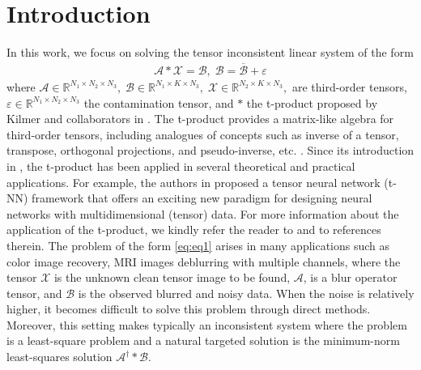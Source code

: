 \documentclass[11pt]{article}
\def\fm#1{\mathcal{#1}}
\def\r{\mathbb{R}}
\begin{document}
\section{Introduction}
In this work, we focus on solving the tensor inconsistent  linear system  of the form
\begin{align}
\label{eq:eq1}
\mathcal{A} * \mathcal{X} =  \mathcal{B},\;  \fm B = \overline{\fm B} + \varepsilon
\end{align}
where $\mathcal{A}\in\mathbb{R}^{N_1\times N_2\times N_3},\;
\mathcal{B}\in\mathbb{R}^{N_1\times K\times N_3},\;
\mathcal{X}\in\mathbb{R}^{N_2\times K\times N_3},$  are third-order tensors, $\varepsilon \in \r^{N_1\times N_2\times N_3}$ the contamination tensor,  and $*$ the t-product proposed by Kilmer and collaborators in  \cite{kilmer2011facto, kilmer2013thirdOrder}. The t-product provides a matrix-like algebra for third-order tensors, including analogues of  concepts such as inverse of a tensor, transpose, orthogonal projections, and  pseudo-inverse, etc. \cite{kilmer2011facto, kilmer2013thirdOrder}. Since its introduction in \cite{kilmer2011facto}, the t-product has been applied in several theoretical and practical applications. For example, the authors in \cite{newman2018} proposed a tensor neural network (t-NN) framework that offers an exciting new paradigm for designing neural networks with multidimensional (tensor) data. For more information about the application of the t-product, we  kindly refer the reader to  \cite{zhang2018, qi2021, wang2020, newman2018, miao2020gener} and to  references therein. The problem of the form \eqref{eq:eq1} arises in many applications such as color image recovery,  MRI images deblurring with multiple channels, where the tensor  $\fm X$ is the unknown clean tensor image to be found, $\fm A$, is a blur operator tensor, and $\fm B$ is the observed blurred and noisy data. When the noise is relatively higher, it becomes difficult to solve this problem  through direct methods. Moreover, this setting makes typically an inconsistent system  where the problem is a least-square problem and a natural targeted solution is the minimum-norm least-squares solution $\fm A^\dagger * \fm B$.
\end{document}
